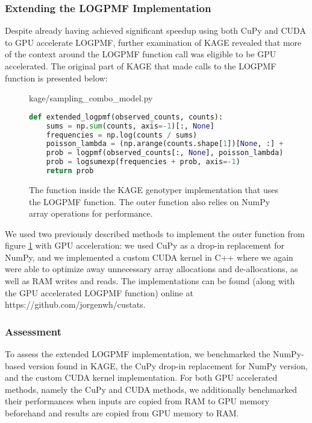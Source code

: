 \subsubsection{Extending the LOGPMF Implementation}
Despite already having achieved significant speedup using both CuPy and CUDA to GPU accelerate LOGPMF, further examination of KAGE revealed that more of the context around the LOGPMF function call was eligible to be GPU accelerated.
The original part of KAGE that made calls to the LOGPMF function is presented below:
\begin{figure}[H] 
\begin{center}
kage/sampling\_combo\_model.py
\end{center}
\begin{lstlisting}[language=Python,style=pycode]
def extended_logpmf(observed_counts, counts):
    sums = np.sum(counts, axis=-1)[:, None]
    frequencies = np.log(counts / sums)
    poisson_lambda = (np.arange(counts.shape[1])[None, :] + ERROR_RATE) * BASE_LAMBDA 
    prob = logpmf(observed_counts[:, None], poisson_lambda) # LOGPMF call is made here
    prob = logsumexp(frequencies + prob, axis=-1)
    return prob
\end{lstlisting}
\caption{
  The function inside the KAGE genotyper implementation that uses the LOGPMF function.
  The outer function also relies on NumPy array operations for performance.
}
\label{methods:gpu_accelerating_genotyping:figures:extended_logpmf_context}
\end{figure}

We used two previously described methods to implement the outer function from figure \ref{methods:gpu_accelerating_genotyping:figures:extended_logpmf_context} with GPU acceleration: we used CuPy as a drop-in replacement for NumPy, and we implemented a custom CUDA kernel in C++ where we again were able to optimize away unnecessary array allocations and de-allocations, as well as RAM writes and reads.
The implementations can be found (along with the GPU accelerated LOGPMF function) online at \url{}https://github.com/jorgenwh/custats.

\subsubsection{Assessment}
To assess the extended LOGPMF implementation, we benchmarked the NumPy-based version found in KAGE, the CuPy drop-in replacement for NumPy version, and the custom CUDA kernel implementation.
For both GPU accelerated methods, namely the CuPy and CUDA methods, we additionally benchmarked their performances when inputs are copied from RAM to GPU memory beforehand and results are copied from GPU memory to RAM.

